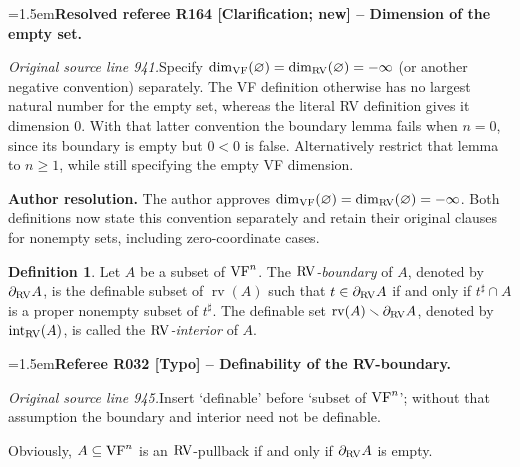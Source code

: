 \documentclass[12pt]{amsart}
\newcommand{\RefereeRemark}[4]{%
  \par\medskip\begingroup\normalfont\small\color{RefereePurple}%
  \emergencystretch=1.5em\noindent\textbf{Referee R#1 [#2] -- #3.}\par\nobreak\noindent #4\par
  \endgroup\medskip
}
\newcommand{\ResolvedRefereeRemark}[5]{%
  \par\medskip\begingroup\normalfont\small\color{gray}%
  \emergencystretch=1.5em\noindent\textbf{Resolved referee R#1 [#2] -- #3.}\par\nobreak\noindent #4\par
  \medskip\color{ResolutionGreen}\noindent\textbf{Author resolution.} #5\par
  \endgroup\medskip
}
\newcommand{\memph}[1]{{\color{magenta}\emph{#1}}}
\theoremstyle{plain}
\theoremstyle{definition}
\newtheorem{defn}[thm]{Definition}
\theoremstyle{remark}
\numberwithin{equation}{section}
\theoremstyle{plain}
\newcommand{\VF}{\textup{VF}}
\newcommand{\RV}{\textup{RV}}
\newcommand{\0}{\emptyset}
\newcommand{\sub}{\subseteq}
\newcommand{\mi}{\smallsetminus}
\DeclareMathOperator{\rv}{rv}
\DeclareMathOperator{\ito}{int}
\begin{document}
\ResolvedRefereeRemark{164}{Clarification; new}{Dimension of the empty set}{%
\textit{Original source line 941.}\quad Specify $\dim_{\VF}(\varnothing)=\dim_{\RV}(\varnothing)=-\infty$ (or another negative convention) separately. The VF definition otherwise has no largest natural number for the empty set, whereas the literal RV definition gives it dimension $0$. With that latter convention the boundary lemma fails when $n=0$, since its boundary is empty but $0<0$ is false. Alternatively restrict that lemma to $n\geq1$, while still specifying the empty VF dimension.
}{The author approves $\dim_{\VF}(\varnothing)=\dim_{\RV}(\varnothing)=-\infty$. Both definitions now state this convention separately and retain their original clauses for nonempty sets, including zero-coordinate cases.}

\begin{defn}
Let $A$ be a subset of $\VF^n$. The \memph{$\RV$-boundary} of $A$, denoted by $\partial_{\RV}A$, is the definable subset of $\rv(A)$ such that $t \in \partial_{\RV} A$ if and only if $t^\sharp \cap A$ is a proper nonempty subset of $t^\sharp$. The definable set $\rv(A) \mi \partial_{\RV}A$, denoted by $\ito_{\RV}(A)$, is called the \memph{$\RV$-interior} of $A$.
\end{defn}

\RefereeRemark{032}{Typo}{Definability of the RV-boundary}{%
\textit{Original source line 945.}\quad Insert `definable' before `subset of $\VF^n$'; without that assumption the boundary and interior need not be definable.
}

Obviously, $A \sub \VF^n$ is an $\RV$-pullback if and only if $\partial_{\RV} A$ is empty.
\end{document}
